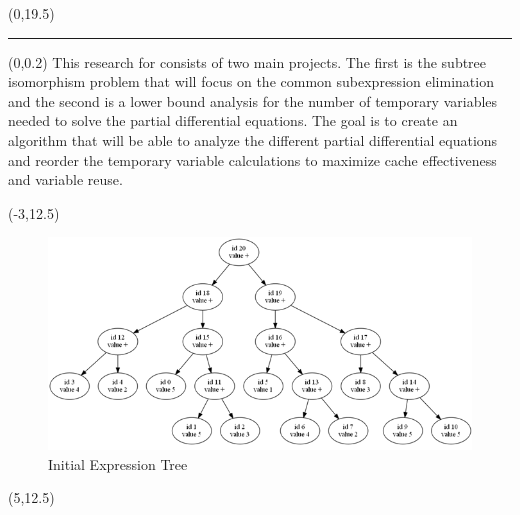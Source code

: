 \documentclass[landscape]{a0poster}
\def\Head#1{\noindent{\textbf{\LARGE\color{Red} #1}}\medskip}
\begin{document}
\begin{textblock}{30}(0,19.5)
	{\color{DarkBlue}\hrule}\medskip
	\Head{Methods} %

	\begin{textblock}{14}(0,0.2)
	This research for consists of two main projects. The first is the subtree isomorphism problem that will focus on the common subexpression elimination and the second is a lower bound analysis for the number of temporary variables needed to solve the partial differential equations. The goal is to create an algorithm that will be able to analyze the different partial differential equations and reorder the temporary variable calculations to maximize cache effectiveness and variable reuse. 

\end{textblock}



\begin{textblock}{14}(-3,12.5)
	\begin{figure}
	\centering
				\includegraphics[scale = 1.8]{tree1_initial.png}
				\caption{Initial Expression Tree}
	\end{figure}
\end{textblock}

\begin{textblock}{14}(5,12.5)
	\begin{figure}
		

\end{figure}
\end{textblock}
\end{textblock}
\end{document}
